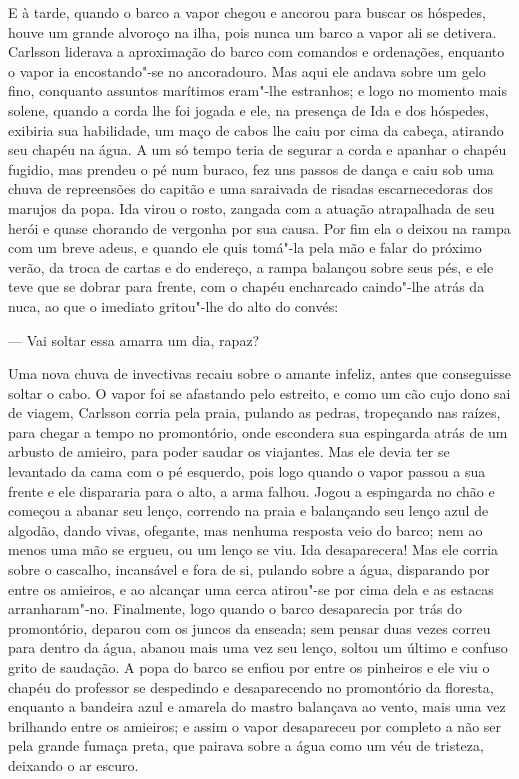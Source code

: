 E à tarde, quando o barco a vapor chegou e ancorou para buscar os hóspedes, houve
um grande alvoroço na ilha, pois nunca um barco a vapor ali se detivera.
Carlsson liderava a aproximação do barco com comandos e ordenações, enquanto o
vapor ia encostando"-se no ancoradouro. Mas aqui ele andava sobre um gelo fino,
conquanto assuntos marítimos eram"-lhe estranhos; e logo no momento mais solene,
quando a corda lhe foi jogada e ele, na presença de Ida e dos hóspedes, exibiria sua
habilidade, um maço de cabos lhe caiu por cima da cabeça, atirando seu chapéu na
água. A um só tempo teria de segurar a corda e apanhar o chapéu fugidio,
mas prendeu o pé num buraco, fez uns passos de dança e caiu sob uma chuva de
repreensões do capitão e uma saraivada de risadas escarnecedoras dos marujos da
popa. Ida virou o rosto, zangada com a atuação atrapalhada de seu herói e quase
chorando de vergonha por sua causa. Por fim ela o deixou na rampa com um breve
adeus, e quando ele quis tomá"-la pela mão e falar do próximo verão, da troca de
cartas e do endereço, a rampa balançou sobre seus pés, e ele teve que se dobrar
para frente, com o chapéu encharcado caindo"-lhe atrás da nuca, ao que o imediato
gritou"-lhe do alto do convés:

--- Vai soltar essa amarra um dia, rapaz?

Uma nova chuva de invectivas recaiu sobre o amante infeliz, antes que
conseguisse soltar o cabo. O vapor foi se afastando pelo estreito, e como um cão
cujo dono sai de viagem, Carlsson corria pela praia, pulando as pedras,
tropeçando nas raízes, para chegar a tempo no promontório, onde escondera sua
espingarda atrás de um arbusto de amieiro, para poder saudar os viajantes. Mas
ele devia ter se levantado da cama com o pé esquerdo, pois logo quando o vapor passou
a sua frente e ele dispararia para o alto, a arma falhou. Jogou a espingarda
no chão e começou a abanar seu lenço, correndo na praia e balançando seu lenço
azul de algodão, dando vivas, ofegante, mas nenhuma resposta veio do barco; nem ao
menos uma mão se ergueu, ou um lenço se viu. Ida desaparecera! Mas
ele corria sobre o cascalho, incansável e fora de si, pulando sobre a água,
disparando por entre os amieiros, e ao alcançar uma cerca atirou"-se por cima dela
e as estacas arranharam"-no. Finalmente, logo quando o barco desaparecia por
trás do promontório, deparou com os juncos da enseada; sem pensar duas vezes
correu para dentro da água, abanou mais uma vez seu lenço, soltou um último e
confuso grito de saudação. A popa do barco se enfiou por entre os pinheiros e
ele viu o chapéu do professor se despedindo e desaparecendo no promontório 
da floresta, enquanto a bandeira azul e amarela do mastro balançava ao vento, 
mais uma vez brilhando entre os amieiros; e assim o vapor desapareceu por 
completo a não ser pela grande fumaça preta, que pairava sobre 
a água como um véu de tristeza, deixando o ar escuro.

